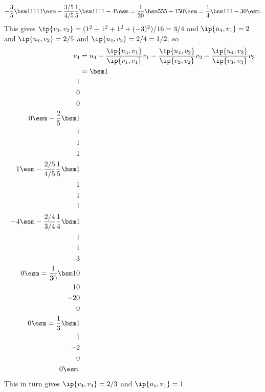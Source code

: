 \begin{solution}
\[      - \frac{3}{5} \bsm 1\\1\\1\\1\\1 \esm
      - \frac{3/5}{4/5} \frac{1}{5} \bsm 1\\1\\1\\1\\-4 \esm
    = \frac{1}{20} \bsm 5\\ 5\\ 5\\ -15\\ 0\esm 
    = \frac{1}{4} \bsm 1\\ 1\\ 1\\ -3\\ 0\esm .
 \]
 This gives $\ip{v_3,v_3}=(1^2+1^2+1^2+(-3)^2)/16=3/4$ and 
 $\ip{u_4,v_1}=2$ and $\ip{u_4,v_2}=2/5$ and
 $\ip{u_4,v_3}=2/4=1/2$, so 
 \begin{align*}
  v_4 &=  u_4 - \frac{\ip{u_4,v_1}}{\ip{v_1,v_1}}v_1
              - \frac{\ip{u_4,v_2}}{\ip{v_2,v_2}}v_2
              - \frac{\ip{u_4,v_3}}{\ip{v_3,v_3}}v_3 \\
   &= \bsm 1\\ 1\\ 0\\ 0\\ 0\esm 
      - \frac{2}{5} \bsm 1\\1\\1\\1\\1 \esm
      - \frac{2/5}{4/5} \frac{1}{5} \bsm 1\\1\\1\\1\\-4 \esm
      - \frac{2/4}{3/4} \frac{1}{4} \bsm 1\\1\\1\\-3\\0 \esm
    = \frac{1}{30} \bsm 10\\ 10\\ -20\\ 0\\ 0\esm 
    = \frac{1}{3} \bsm 1\\ 1\\ -2\\ 0\\ 0\esm .
 \end{align*}
 This in turn gives $\ip{v_4,v_4}=2/3$ and $\ip{u_5,v_1}=1$

\end{solution}
